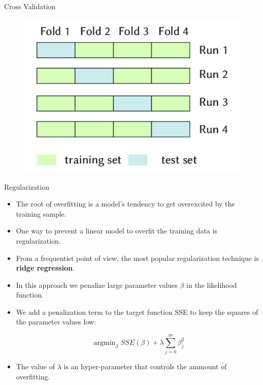 \documentclass[handout]{beamer}
\begin{document}
\begin{frame}{Cross Validation}
\scriptsize{

\begin{figure}[h!]
	\centering
	\includegraphics[scale=0.4]{pics/crossvalidation.png}
\end{figure}

} 
\end{frame}




\begin{frame}{Regularization}
\scriptsize{

\begin{itemize}

\item The root of overfitting is a model's tendency to get overexcited by the training sample.

\item One way to prevent a linear model to overfit the training data is regularization.

\item  From a frequentist point of view, the most popular regularization technique is \textbf{ridge regression}.


\item In this approach we penalize large parameter values $\beta$ in the likelihood function.

\item We add a penalization term to the target function SSE to keep  the squares of the parameter values low:

\begin{equation}
 \operatorname{argmin}_{\beta} SSE(\beta) + \lambda \sum_{j=0}^m\beta_j^2 
\end{equation} 

\item The value of $\lambda$ is an hyper-parameter that controls the ammount of overfitting.



\end{itemize}


} 
\end{frame}
\end{document}
